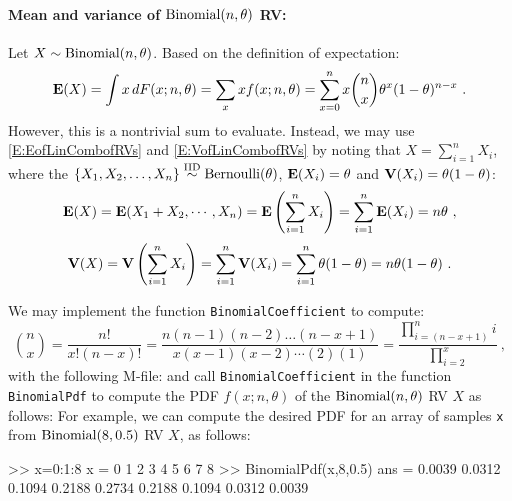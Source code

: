 \paragraph{Mean and variance of $\mbox{{\rm Binomial}}(n,\theta)$ RV:}
Let $X \sim \mbox{{\rm Binomial}}(n,\theta)$.  Based on the definition of expectation:
\[
\e(X) = \int x \, dF(x; n,\theta) = \sum_x x f(x;n,\theta) = \sum_{x =0}^n x \binom{n}{x} \theta^x (1-\theta)^{n-x} \ .
\]
However, this is a nontrivial sum to evaluate.  Instead, we may use \eqref{E:EofLinCombofRVs} and \eqref{E:VofLinCombofRVs} by noting that $X = \sum_{i=1}^n X_i$, where the $\{X_1,X_2,\ldots,X_n \} \overset{{\rm IID}}{\sim} \mbox{{\rm Bernoulli}}(\theta)$, $\mathbf{E}(X_i) = \theta$ and $\mathbf{V}(X_i)=\theta(1-\theta)$:
\[
\mathbf{E}(X) = \mathbf{E}(X_1+X_2, \cdots ,X_n) = \mathbf{E} \left( \sum_{i=1}^n X_i \right) = \sum_{i=1}^n \mathbf{E}(X_i) = n \theta \ ,
\]
\[
\mathbf{V}(X) = \mathbf{V} \left( \sum_{i=1}^n X_i \right) = \sum_{i=1}^n \mathbf{V}(X_i) = \sum_{i=1}^n{\theta(1-\theta)} = n\theta(1-\theta) \ .
\]

\begin{labwork}\label{LW:BinomialPdf}
We may implement the \Matlab function {\tt BinomialCoefficient} to compute:
\[
\binom{n}{x} =  \frac{n !}{x! (n-x)!} = \frac{n(n-1)(n-2)\ldots(n-x+1)}{x(x-1)(x-2)\cdots (2)(1)} = \frac{\prod_{i=(n-x+1)}^n i}{\prod_{i=2}^x} \ ,
\]
with the following M-file:
and call {\tt BinomialCoefficient} in the function {\tt BinomialPdf} to compute the PDF $f(x;n,\theta)$ of the $\mbox{{\rm Binomial}}(n,\theta)$ RV $X$ as follows:
For example, we can compute the desired PDF for an array of samples {\tt x} from $\mbox{{\rm Binomial}}(8,0.5)$ RV $X$, as follows:
\begin{VrbM}
>> x=0:1:8
x =     0     1     2     3     4     5     6     7     8
>> BinomialPdf(x,8,0.5)
ans =    0.0039    0.0312    0.1094    0.2188    0.2734    0.2188    0.1094    0.0312    0.0039
\end{VrbM}
\end{labwork}

